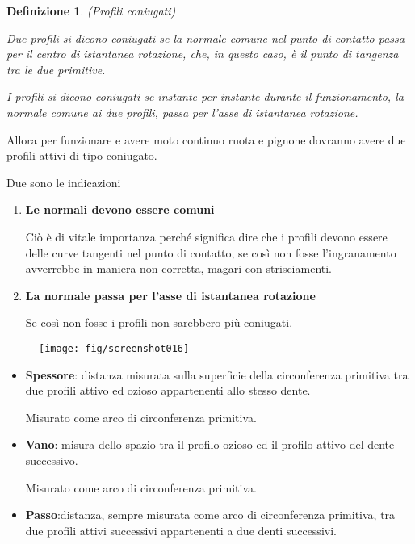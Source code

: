 \documentclass[a4paper, 15pt]{article}
\newtheorem*{deff}{Definizione}
\begin{document}
\begin{adjustwidth}{2in}{}
	\begin{deff}(Profili coniugati)
		
		Due profili si dicono coniugati se la normale comune nel punto
		di contatto passa per il centro di istantanea rotazione, che, in
		questo caso, è il punto di tangenza tra le due primitive. \newline 
		
		I profili si dicono coniugati se instante per instante durante il funzionamento, la normale comune ai due profili, passa per l'asse di istantanea rotazione. \newline
	\end{deff}
	
	Allora per funzionare e avere moto continuo ruota e pignone dovranno avere due profili attivi di tipo coniugato.
	
	Due sono le indicazioni
	\begin{enumerate}
		\item \textbf{Le normali devono essere comuni}
		
		Ciò è di vitale importanza perché significa dire che i profili devono essere delle curve tangenti nel punto di contatto, se così non fosse l'ingranamento avverrebbe in maniera non corretta, magari con strisciamenti.
		
		\item \textbf{La normale passa per l'asse di istantanea rotazione}
		
		Se così non fosse i profili non sarebbero più coniugati.		
	\end{enumerate}
\newpage

	\begin{figure}[H]
		\centering
		\texttt{[image: fig/screenshot016]}
		\label{fig:screenshot016}
	\end{figure}
	\begin{itemize}
		\item \textbf{Spessore}: distanza misurata sulla superficie della circonferenza primitiva tra due profili attivo ed ozioso appartenenti allo stesso dente.
		
		Misurato come arco di circonferenza primitiva.
		
		\item \textbf{Vano}: misura dello spazio tra il profilo ozioso ed il profilo attivo del dente successivo.
		
		Misurato come arco di circonferenza primitiva.
		
		\item \textbf{Passo}:distanza, sempre misurata come arco di circonferenza primitiva, tra due profili attivi successivi appartenenti a due denti successivi.
		

\end{itemize}
\end{adjustwidth}
\end{document}
